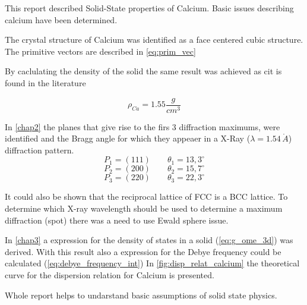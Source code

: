 This report described Solid-State properties of Calcium. Basic issues describing calcium have been determined.

The crystal structure of Calcium was identified as a face centered cubic structure.
The primitive vectors are described in \autoref{eq:prim_vec}

By caclulating the density of the solid the same result was achieved
as cit is found in the literature \cite{web_elem_calcium}

$$\rho_{Ca} =  1.55 \frac{g}{cm^3}$$

In \ref{chap2}  the planes that give rise to the firs 3
diffraction maximums, were identified and the Bragg angle for which they
appeaer in a X-Ray ($\lambda = 1.54 \, \mathring{A}$) diffraction pattern.
$$P_1 = (111) \qquad \theta_1 = 13,3^\circ$$
$$P_2 = (200) \qquad \theta_2 = 15,7^\circ$$
$$P_3 = (220) \qquad \theta_3 = 22,3^\circ$$
 
It could also be shown that the reciprocal lattice of FCC is a BCC lattice.
To determine which X-ray wavelength should be used to determine a maximum diffraction (spot) there was a need to use Ewald sphere issue. 

In \ref{chap3}  a expression for the density of states
in a solid (\autoref{eq:g_ome_3d}) was derived.
With this result also a expression for the Debye frequency could be calculated
(\autoref{eq:debye_frequency_int})
In \autoref{fig:disp_relat_calcium} the theoretical curve for the dispersion 
relation for Calcium is presented.

Whole report helps to undarstand basic assumptions of solid state physics.